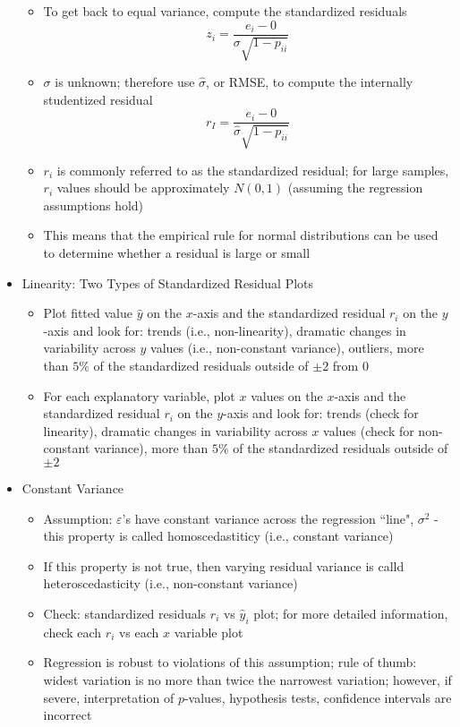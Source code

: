 \documentclass[12pt]{article}
\begin{document}
\begin{itemize}
\begin{itemize}
\item To get back to equal variance, compute the standardized residuals 
$$ z_i = \frac{e_i - 0}{\sigma \sqrt{1 - p_{ii}}} $$ 
\item $\sigma$ is unknown; therefore use $\hat{\sigma}$, or RMSE, to compute the internally studentized residual $$ r_I = \frac{e_i - 0}{\hat{\sigma}\sqrt{1 - p_{ii}}} $$ 
\item $r_i$ is commonly referred to as the standardized residual; for large samples, $r_i$ values should be approximately $N(0,1)$ (assuming the regression assumptions hold) 
\item This means that the empirical rule for normal distributions can be used to determine whether a residual is large or small \end{itemize} 
\item Linearity: Two Types of Standardized Residual Plots \begin{itemize} 
\item Plot fitted value $\hat{y}$ on the $x$-axis and the standardized residual $r_i$ on the $y$-axis and look for: trends (i.e., non-linearity), dramatic changes in variability across $\hat{y}$ values (i.e., non-constant variance), outliers, more than $5\%$ of the standardized residuals outside of $\pm 2$ from $0$ 
\item For each explanatory variable, plot $x$ values on the $x$-axis and the standardized residual $r_i$ on the $y$-axis and look for: trends (check for linearity), dramatic changes in variability across $x$ values (check for non-constant variance), more than $5\%$ of the standardized residuals outside of $\pm 2$ \end{itemize} 
\item Constant Variance \begin{itemize} 
\item Assumption: $\varepsilon$'s have constant variance across the regression ``line", $\sigma^2$ - this property is called homoscedastiticy (i.e., constant variance)
\item If this property is not true, then varying residual variance is calld heteroscedasticity (i.e., non-constant variance) 
\item Check: standardized residuals $r_i$ vs $\hat{y}_i$ plot; for more detailed information, check each $r_i$ vs each $x$ variable plot 
\item Regression is robust to violations of this assumption; rule of thumb: widest variation is no more than twice the narrowest variation; however, if severe, interpretation of $p$-values, hypothesis tests, confidence intervals are incorrect \end{itemize} 

\end{itemize}
\end{document}
